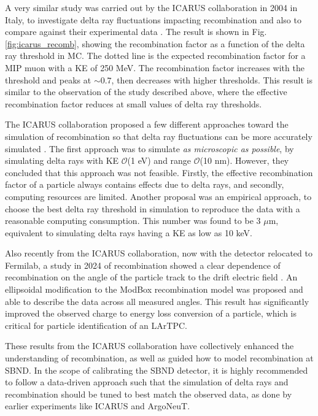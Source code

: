 A very similar study was carried out by the ICARUS collaboration in 2004 in Italy, to investigate delta ray fluctuations impacting recombination and also to compare against their experimental data \cite{icarus_recomb}. 
The result is shown in Fig. \ref{fig:icarus_recomb}, showing the recombination factor as a function of the delta ray threshold in MC. 
The dotted line is the expected recombination factor for a MIP muon with a KE of 250 MeV.
The recombination factor increases with the threshold and peaks at $\sim0.7$, then decreases with higher thresholds. 
This result is similar to the observation of the study described above, where the effective recombination factor reduces at small values of delta ray thresholds.

The ICARUS collaboration proposed a few different approaches toward the simulation of recombination so that delta ray fluctuations can be more accurately simulated \cite{icarus_recomb}. 
The first approach was to simulate \textit{as microscopic as possible}, by simulating delta rays with KE $\mathcal{O}$(1 eV) and range $\mathcal{O}$(10 nm).
However, they concluded that this approach was not feasible.
Firstly, the effective recombination factor of a particle always contains effects due to delta rays, and secondly, computing resources are limited.
Another proposal was an empirical approach, to choose the best delta ray threshold in simulation to reproduce the data with a reasonable computing consumption.
This number was found to be 3 $\mu$m, equivalent to simulating delta rays having a KE as low as 10 keV.


Also recently from the ICARUS collaboration, now with the detector relocated to Fermilab, a study in 2024 of recombination showed a clear dependence of recombination on the angle of the particle track to the drift electric field \cite{elipsoid_recomb}.
An ellipsoidal modification to the ModBox recombination model was proposed and able to describe the data across all measured angles. 
This result has significantly improved the observed charge to energy loss conversion of a particle, which is critical for particle identification of an LArTPC.   

These results from the ICARUS collaboration have collectively enhanced the understanding of recombination, as well as guided how to model recombination at SBND.
In the scope of calibrating the SBND detector, it is highly recommended to follow a data-driven approach such that the simulation of delta rays and recombination should be tuned to best match the observed data, as done by earlier experiments like ICARUS and ArgoNeuT.

